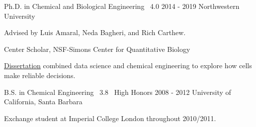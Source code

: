 

\begin{cventries}

  \cventrynew
	{Ph.D. in Chemical and Biological Engineering \bullet\ 4.0} 	
	{2014 - 2019}
	{Northwestern University}
    { \begin{cvitems} 
       	\item {Advised by Luis Amaral, Neda Bagheri, and Rich Carthew.}
      	\item {Center Scholar, NSF-Simons Center for Quantitative Biology}
      	\item {\href{https://github.com/sebastianbernasek/dissertation}{Dissertation} combined data science and chemical engineering to explore how cells make reliable decisions.}
      \end{cvitems}}
            	   
  \cventrynew
	{B.S. in Chemical Engineering \bullet\ 3.8 \bullet\ High Honors} 	
	{2008 - 2012} 	
	{University of California, Santa Barbara}    
    {
      \begin{cvitems} %
      	\item {Exchange student at Imperial College London throughout 2010/2011.}      	
      \end{cvitems}
    }

\end{cventries}
